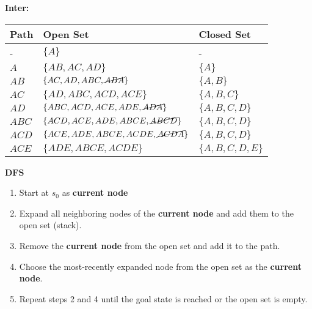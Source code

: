 \begin{example}
    \textbf{Inter:}
    \begin{center}
        \begin{tabular}{lll}
        \toprule
        \textbf{Path} & \textbf{Open Set} & \textbf{Closed Set} \\
        \midrule
        - & $\{A\}$ & - \\
        $A$ & $\{AB, AC, AD\}$ & $\{A\}$ \\
        $AB$ & $\{AC, AD, ABC, \cancel{ABA}\}$ & $\{A, B\}$ \\
        $AC$ & $\{AD, ABC, ACD, ACE\}$ & $\{A, B, C\}$ \\
        $AD$ & $\{ABC, ACD, ACE, ADE, \cancel{ADA}\}$ & $\{A, B, C, D\}$ \\
        $ABC$ & $\{ACD, ACE, ADE, ABCE, \cancel{ABCD}\}$ & $\{A, B, C, D\}$ \\
        $ACD$ & $\{ACE, ADE, ABCE, ACDE, \cancel{ACDA}\}$ & $\{A, B, C, D\}$ \\
        $ACE$ & $\{ADE, ABCE, ACDE\}$ & $\{A, B, C, D, E\}$ \\
        \bottomrule
        \end{tabular}
    \end{center}
\end{example}
\newpage



\begin{process} \textbf{DFS}
    \begin{enumerate}
        \item Start at $s_0$ as \textbf{current node}
        \item Expand all neighboring nodes of the \textbf{current node} and add them to the open set (stack).
        \item Remove the \textbf{current node} from the open set and add it to the path. 
        \item Choose the most-recently expanded node from the open set as the \textbf{current node}.
        \item Repeat steps 2 and 4 until the goal state is reached or the open set is empty.
    \end{enumerate}
\end{process}

